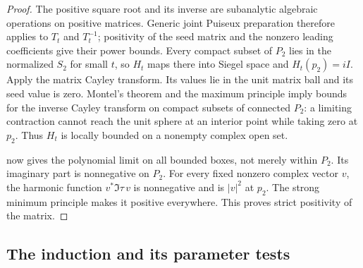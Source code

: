 \begin{proof}
The positive square root and its inverse are subanalytic algebraic operations on positive matrices.  Generic joint Puiseux preparation therefore applies to $T_t$ and $T_t^{-1}$; positivity of the seed matrix and the nonzero leading coefficients give their power bounds. Every compact subset of $P_2$ lies in the normalized $S_2$ for small $t$, so $H_t$ maps there into Siegel space and $H_t(p_2)=iI$. Apply the matrix Cayley transform.  Its values lie in the unit matrix ball and its seed value is zero.  Montel's theorem and the maximum principle imply bounds for the inverse Cayley transform on compact subsets of connected $P_2$: a limiting contraction cannot reach the unit sphere at an interior point while taking zero at $p_2$. Thus $H_t$ is locally bounded on a nonempty complex open set.

 now gives the polynomial limit on all bounded boxes, not merely within $P_2$.  Its imaginary part is nonnegative on $P_2$.  For every fixed nonzero complex vector $v$, the harmonic function $v^*\Im\tau\,v$ is nonnegative and is $|v|^2$ at $p_2$.  The strong minimum principle makes it positive everywhere.  This proves strict positivity of the matrix.
\end{proof}

\subsection{The induction and its parameter tests}


